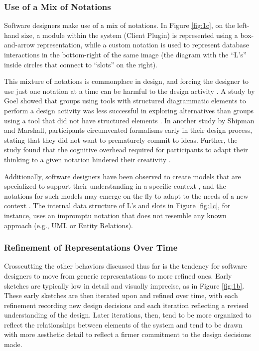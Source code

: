 \subsubsection{Use of a Mix of Notations}
\label{behaviorsofsoftwaredesignerswhilesketching:3}

Software designers make use of a mix of notations. In Figure \ref{fig:1c}, on the left-hand size, a module within the system (Client Plugin) is represented using a box-and-arrow representation,  while a custom notation is used to represent database interactions in the bottom-right of the same image (the diagram with the ``L's'' inside circles that connect to ``slots'' on the right). 

This mixture of notations is commonplace in design, and forcing the designer to use just one notation at a time can be harmful to the design activity \citep{Goel,Yatani}. A study by Goel showed that groups using tools with structured diagrammatic elements to perform a design activity was less successful in exploring alternatives than groups using a tool that did not have structured elements \citep{Goel}. In another study by Shipman and Marshall, participants circumvented formalisms early in their design process, stating that they did not want to prematurely commit to ideas. Further, the study found that the cognitive overhead required for participants to adapt their thinking to a given notation hindered their creativity \citep{Shipman}.

Additionally, software designers have been observed to create models that are specialized to support their understanding in a specific context \citep{Petre}, and the notations for such models may emerge on the fly to adapt to the needs of a new context \citep{Dekela}. The internal data structure of L's and slots in Figure \ref{fig:1c}, for instance, uses an impromptu notation that does not resemble any known approach (e.g., UML or Entity Relations).

\subsubsection{Refinement of Representations Over Time}
\label{behaviorsofsoftwaredesignerswhilesketching:4}

Crosscutting the other behaviors discussed thus far is the tendency for software designers to move from generic representations to more refined ones. Early sketches are typically low in detail and visually imprecise, as in Figure \ref{fig:1b}. These early sketches are then iterated upon and refined over time, with each refinement recording new design decisions and each iteration reflecting a revised understanding of the design. Later iterations, then, tend to be more organized to reflect the relationships between elements of the system and tend to be drawn with more aesthetic detail to reflect a firmer commitment to the design decisions made.

